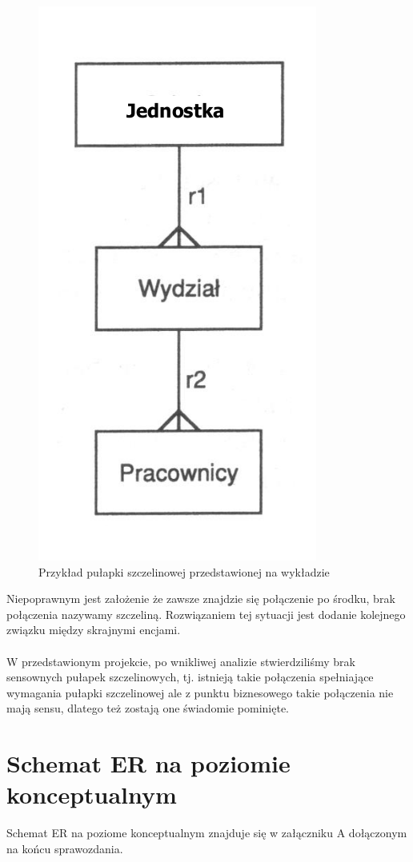 \documentclass{mwrep}
\begin{document}
\begin{figure}[H]
	\centering
	\includegraphics[scale=0.4]{./szczelina.png}
	\caption{Przykład pułapki szczelinowej przedstawionej na wykładzie\cite{Kowalczyk1}}
\end{figure}

Niepoprawnym jest założenie że zawsze znajdzie się połączenie po środku, brak połączenia nazywamy szczeliną. Rozwiązaniem 
tej sytuacji jest dodanie kolejnego związku między skrajnymi encjami. \\
\\
W przedstawionym projekcie, po wnikliwej analizie stwierdziliśmy brak sensownych pułapek szczelinowych, tj. istnieją 
takie połączenia spełniające wymagania pułapki szczelinowej ale z punktu biznesowego takie połączenia nie mają sensu, dlatego też 
zostają one świadomie pominięte.	

\section{Schemat ER na poziomie konceptualnym}
Schemat ER na poziome konceptualnym znajduje się w załączniku A dołączonym na końcu sprawozdania.
\end{document}
